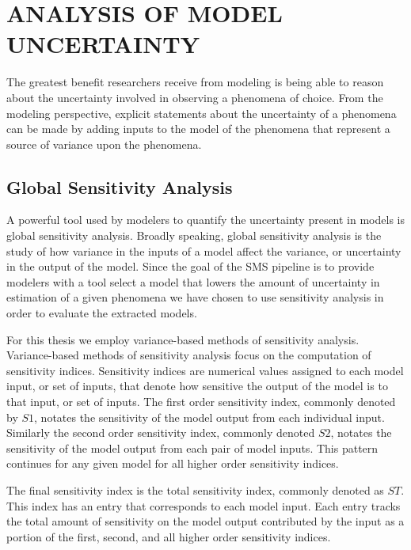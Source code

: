 \chapter{ANALYSIS OF MODEL UNCERTAINTY\label{chapter:analysis}}

The greatest benefit researchers receive from modeling is being able to reason about the uncertainty involved in observing a phenomena of choice. From the modeling perspective, explicit statements about the uncertainty of a phenomena can be made by adding inputs to the model of the phenomena that represent a source of variance upon the phenomena.


\section{Global Sensitivity Analysis\label{sec:sens_analysis}}
A powerful tool used by modelers to quantify the uncertainty present in models is global sensitivity analysis. Broadly speaking, global sensitivity analysis is the study of how variance in the inputs of a model affect the variance, or uncertainty in the output of the model. Since the goal of the SMS pipeline is to provide modelers with a tool select a model that lowers the amount of uncertainty in estimation of a given phenomena we have chosen to use sensitivity analysis in order to evaluate the extracted models.

For this thesis we employ variance-based methods of sensitivity analysis.
Variance-based methods of sensitivity analysis focus on the computation of sensitivity indices. Sensitivity indices are numerical values assigned to each model input, or set of inputs, that denote how sensitive the output of the model is to that input, or set of inputs. The first order sensitivity index, commonly denoted by $S1$, notates the sensitivity of the model output from each individual input. Similarly the second order sensitivity index, commonly denoted $S2$, notates the sensitivity of the model output from each pair of model inputs. This pattern continues for any given model for all higher order sensitivity indices.

The final sensitivity index is the total sensitivity index, commonly denoted as $ST$. This index has an entry that corresponds to each model input. Each entry tracks the total amount of sensitivity on the model output contributed by the input as a portion of the first, second, and all higher order sensitivity indices.

